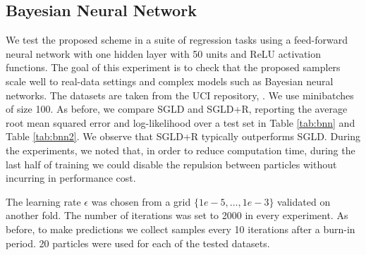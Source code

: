 \subsection{Bayesian Neural Network} 
We test the proposed scheme in a suite of regression tasks using a feed-forward neural network with one hidden layer with 50 units and ReLU activation functions. The goal of this experiment is to check that the proposed samplers scale well to real-data settings and complex models such as Bayesian neural networks. The datasets are taken from the UCI repository, \cite{Lichman:2013}. We use minibatches of size 100. %
As before, we compare SGLD and SGLD+R, reporting the average root mean squared error and log-likelihood over a test set in Table \ref{tab:bnn} and Table \ref{tab:bnn2}. We observe that SGLD+R typically outperforms SGLD. During the experiments, we noted that, in order to reduce computation time, during the last half of training we could disable the repulsion between particles without incurring in performance cost.

The learning rate $\epsilon$ was chosen from a grid $\{1e-5, \ldots, 1e-3 \}$ validated on another fold. The number of iterations was set to 2000 in every experiment. As before, to make predictions we collect samples every 10 iterations after a burn-in period. 20 particles were used for each of the tested datasets.

\begin{table}[h]
\caption{Log-Likelihood results for the BNN experiments}\label{tab:bnn}
\end{table}

